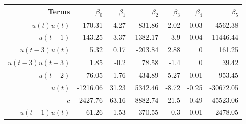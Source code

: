 \begin{tabular}{rrrrrrr}
Terms & $\beta_0$ & $\beta_1$ & $\beta_2$ & $\beta_3$ & $\beta_4$ & $\beta_5$ \\ 
\hline 
$u(t)u(t)$ & -170.31 & 4.27 & 831.86 & -2.02 & -0.03 & -4562.38 \\ 
$u(t-1)$ & 143.25 & -3.37 & -1382.17 & -3.9 & 0.04 & 11446.44 \\ 
$u(t-3)u(t)$ & 5.32 & 0.17 & -203.84 & 2.88 & 0 & 161.25 \\ 
$u(t-3)u(t-3)$ & 1.85 & -0.2 & 78.58 & -1.4 & 0 & 39.42 \\ 
$u(t-2)$ & 76.05 & -1.76 & -434.89 & 5.27 & 0.01 & 953.45 \\ 
$u(t)$ & -1216.06 & 31.23 & 5342.46 & -8.72 & -0.25 & -30672.05 \\ 
$c$ & -2427.76 & 63.16 & 8882.74 & -21.5 & -0.49 & -45523.06 \\ 
$u(t-1)u(t)$ & 61.26 & -1.53 & -370.55 & 0.3 & 0.01 & 2478.05 \\ 
\hline 
\end{tabular}